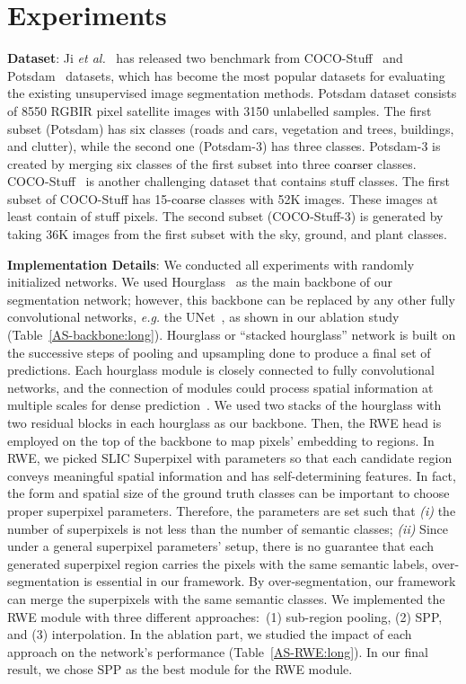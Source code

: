 \documentclass[letterpaper, 10 pt, journal, twoside]{IEEEtran}
\newcommand{\eg}{\emph{e.g.}\xspace}
\newcommand{\etal}{\emph{et al.}\xspace}
\newcommand{\revised}{\textcolor{black}}{}
\begin{document}
\section{Experiments} \label{sec:Ex}
\textbf{Dataset}: Ji \etal~\cite{IIC} has released two benchmark from COCO-Stuff~\cite{Cocostuff} and Potsdam~\cite{Potsdam} datasets, which has become the most popular datasets for evaluating the existing unsupervised image segmentation methods. Potsdam dataset consists of 8550 RGBIR  pixel satellite images with 3150 unlabelled samples. The first subset (Potsdam) has six classes (roads and cars, vegetation and trees, buildings, and clutter), while the second one (Potsdam-3) has three classes. Potsdam-3 is created by merging six classes of the first subset into three \revised{coarser} classes. COCO-Stuff~\cite{Cocostuff} is another challenging dataset that contains stuff classes. The first subset of COCO-Stuff has 15-\revised{coarse} classes with 52K images. These images at least contain  of stuff pixels. The second subset (COCO-Stuff-3) is generated by taking 36K images from the first subset with the sky, ground, and plant classes.\par

\textbf{Implementation Details}: We conducted all experiments with randomly initialized networks. We used Hourglass~\cite{hourglass} as the main backbone of our segmentation network; however, this backbone can be replaced by any other fully convolutional networks, \eg the UNet~\cite{UNet}, as shown in our ablation study (Table~\ref{AS-backbone:long}). Hourglass or “stacked hourglass” network is built on the successive steps of pooling and upsampling done to produce a final set of predictions. Each hourglass module is closely connected to fully convolutional networks, and the connection of modules could process spatial information at multiple scales for dense prediction~\cite{hourglass}. We used two stacks of the hourglass with two residual blocks in each hourglass as our backbone. Then, the RWE head is employed on the top of the backbone to map pixels' embedding to regions. In RWE, we picked SLIC Superpixel \cite{SLIC} with parameters so that each candidate region conveys meaningful spatial information and has self-determining features. In fact, the form and spatial size of the ground truth classes can be important to choose proper superpixel parameters. Therefore, the parameters are set such that \emph{(i)} the number of superpixels is not less than the number of semantic classes; \emph{(ii)} Since under a general superpixel parameters' setup, there is no guarantee that each generated superpixel region carries the pixels with the same semantic labels, over-segmentation is essential in our framework. By over-segmentation, our framework can merge the superpixels with the same semantic classes. We implemented the RWE module with three different approaches:~(1) sub-region pooling, (2) SPP, and (3) interpolation. In the ablation part, we studied the impact of each approach on the network's performance (Table~\ref{AS-RWE:long}). In our final result, we chose SPP as the best module for the RWE module.
\end{document}
